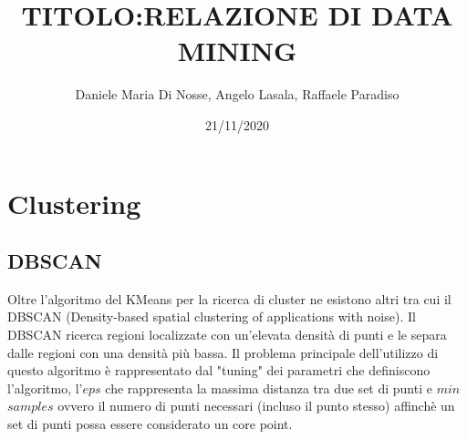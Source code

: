 \documentclass[english]{article}
\begin{document}
\title{TITOLO:RELAZIONE DI DATA MINING}
\author{Daniele Maria Di Nosse, Angelo Lasala, Raffaele Paradiso}
\date{21/11/2020\newpage}

\maketitle
\tableofcontents{}

\newpage

\section{Clustering}
\subsection{DBSCAN}
Oltre l'algoritmo del KMeans per la ricerca di cluster ne esistono altri tra cui il DBSCAN (Density-based spatial clustering of applications with noise).
Il DBSCAN ricerca regioni localizzate con un'elevata densità di punti e le separa dalle regioni con una densità più bassa. Il problema principale dell'utilizzo di questo algoritmo è rappresentato dal "tuning" dei parametri che definiscono l'algoritmo, l'$eps$ che rappresenta la massima distanza tra due set di punti e $min$ $samples$ ovvero il numero di punti necessari (incluso il punto stesso) affinchè un set di punti possa essere considerato un core point.\\ 
\end{document}
